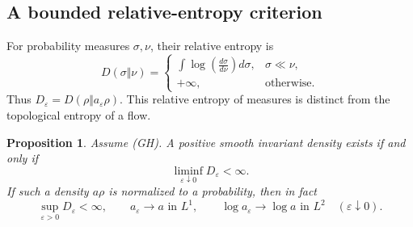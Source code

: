 \documentclass[11pt]{article}
\newtheorem{proposition}[theorem]{Proposition}
\theoremstyle{definition}
\theoremstyle{remark}
\newcommand{\eps}{\varepsilon}
\begin{document}
\subsection{A bounded relative-entropy criterion}

For probability measures $\sigma,\nu$, their relative entropy is
\[
 D(\sigma\Vert\nu)=
 \begin{cases}
 \displaystyle\int\log\!\left(\frac{d\sigma}{d\nu}\right)d\sigma,
     &\sigma\ll\nu,\\
 +\infty,&\text{otherwise}.
 \end{cases}
\]
Thus $D_\eps=D(\rho\Vert a_\eps\rho)$. This relative entropy of measures is distinct from the topological entropy of a flow.

\begin{proposition}\label{prop:relative}
Assume (GH). A positive smooth invariant density exists if and only if
\begin{equation}\label{eq:bounded-D}
 \liminf_{\eps\downarrow0}D_\eps<\infty.
\end{equation}
If such a density $a\rho$ is normalized to a probability, then in fact
\begin{equation}\label{eq:noise-convergence}
 \sup_{\eps>0}D_\eps<\infty,\qquad
 a_\eps\longrightarrow a\text{ in }L^1,\qquad
 \log a_\eps\longrightarrow\log a\text{ in }L^2
 \quad(\eps\downarrow0).
\end{equation}
\end{proposition}
\end{document}
